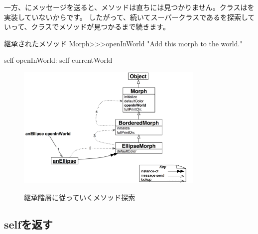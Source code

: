 \documentclass[a4paper,10pt,twoside]{book}
\begin{document}
一方、にメッセージを送ると、メソッドは直ちには見つかりません。クラスはを実装していないからです。
したがって、続いてスーパークラスであるを探索していって、クラスでメソッドが見つかるまで続きます。

\begin{method}[openInWorld]{継承されたメソッド}
Morph>>>openInWorld
	"Add this morph to the world."

	self openInWorld: self currentWorld
\end{method}

\begin{figure}[htb]
\begin{center}
	{\includegraphics[width=0.8\textwidth]{openInWorldLookup}}
\caption{継承階層に従っていくメソッド探索}
\end{center}
\end{figure}

\subsection{selfを返す}
\end{document}

